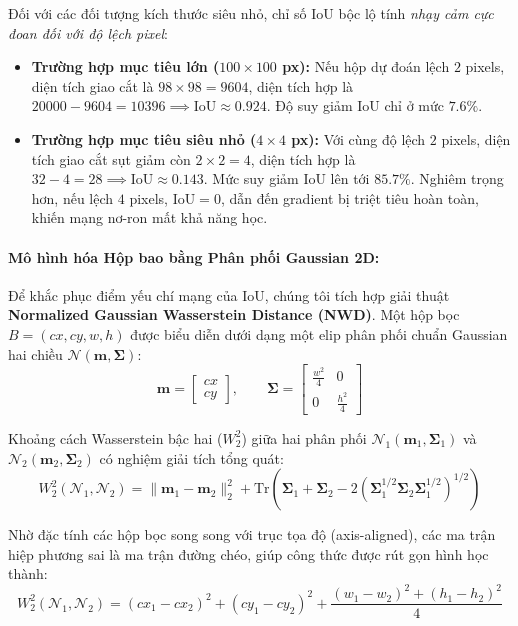 \documentclass[11pt,a4paper]{article}
\begin{document}
Đối với các đối tượng kích thước siêu nhỏ, chỉ số IoU bộc lộ tính \textit{nhạy cảm cực đoan đối với độ lệch pixel}:
\begin{itemize}
    \item \textbf{Trường hợp mục tiêu lớn ($100 \times 100$ px):} Nếu hộp dự đoán lệch $2$ pixels, diện tích giao cắt là $98 \times 98 = 9604$, diện tích hợp là $20000 - 9604 = 10396 \implies \text{IoU} \approx 0.924$. Độ suy giảm IoU chỉ ở mức $7.6\%$.
    \item \textbf{Trường hợp mục tiêu siêu nhỏ ($4 \times 4$ px):} Với cùng độ lệch $2$ pixels, diện tích giao cắt sụt giảm còn $2 \times 2 = 4$, diện tích hợp là $32 - 4 = 28 \implies \text{IoU} \approx 0.143$. Mức suy giảm IoU lên tới $85.7\%$. Nghiêm trọng hơn, nếu lệch $4$ pixels, $\text{IoU} = 0$, dẫn đến gradient bị triệt tiêu hoàn toàn, khiến mạng nơ-ron mất khả năng học.
\end{itemize}

\paragraph{Mô hình hóa Hộp bao bằng Phân phối Gaussian 2D:}
Để khắc phục điểm yếu chí mạng của IoU, chúng tôi tích hợp giải thuật \textbf{Normalized Gaussian Wasserstein Distance (NWD)}. Một hộp bọc $B = (cx, cy, w, h)$ được biểu diễn dưới dạng một elip phân phối chuẩn Gaussian hai chiều $\mathcal{N}(\mathbf{m}, \mathbf{\Sigma})$:
\begin{equation}
    \mathbf{m} = \begin{bmatrix} cx \\ cy \end{bmatrix}, \qquad \mathbf{\Sigma} = \begin{bmatrix} \frac{w^2}{4} & 0 \\ 0 & \frac{h^2}{4} \end{bmatrix}
\end{equation}

Khoảng cách Wasserstein bậc hai ($W_2^2$) giữa hai phân phối $\mathcal{N}_1(\mathbf{m}_1, \mathbf{\Sigma}_1)$ và $\mathcal{N}_2(\mathbf{m}_2, \mathbf{\Sigma}_2)$ có nghiệm giải tích tổng quát:
\begin{equation}
    W_2^2(\mathcal{N}_1, \mathcal{N}_2) = \|\mathbf{m}_1 - \mathbf{m}_2\|_2^2 + \text{Tr}\left(\mathbf{\Sigma}_1 + \mathbf{\Sigma}_2 - 2\left(\mathbf{\Sigma}_1^{1/2} \mathbf{\Sigma}_2 \mathbf{\Sigma}_1^{1/2}\right)^{1/2}\right)
\end{equation}

Nhờ đặc tính các hộp bọc song song với trục tọa độ (axis-aligned), các ma trận hiệp phương sai là ma trận đường chéo, giúp công thức được rút gọn hình học thành:
\begin{equation}
    W_2^2(\mathcal{N}_1, \mathcal{N}_2) = (cx_1 - cx_2)^2 + (cy_1 - cy_2)^2 + \frac{(w_1 - w_2)^2 + (h_1 - h_2)^2}{4}
\end{equation}
\end{document}

